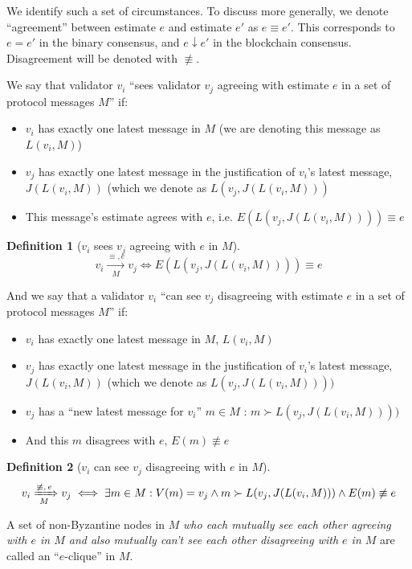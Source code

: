 \documentclass{article}
\theoremstyle{definition}
\newtheorem{defn}{Definition}[section]
\begin{document}
We identify such a set of circumstances. To discuss more generally, we denote ``agreement'' between estimate $e$ and estimate $e'$ as $e \equiv e'$. This corresponds to $e = e'$ in the binary consensus, and $e \downarrow e'$ in the blockchain consensus. Disagreement will be denoted with $\not\equiv$.

We say that validator $v_i$ ``sees validator $v_j$ agreeing with estimate $e$ in a set of protocol messages $M$'' if:
\begin{itemize}
\item $v_i$ has exactly one latest message in $M$ (we are denoting this message as $L(v_i, M)$)
\item $v_j$ has exactly one latest message in the justification of $v_i$'s latest message, $J(L(v_i, M))$ (which we denote as $L(v_j, J(L(v_i, M)))$
\item This message's estimate agrees with $e$, i.e. $E(L(v_j, J(L(v_i, M)))) \equiv e$
\end{itemize}

\begin{defn}[$v_i$ sees $v_j$ agreeing with $e$ in $M$]
$$
v_i \xrightarrow[\text{$M$}]{\text{$\equiv, e$}} v_j \iff E(L(v_j, J(L(v_i, M)))) \equiv e
$$
\end{defn}

And we say that a validator $v_i$ ``can see $v_j$ disagreeing with estimate $e$ in a set of protocol messages $M$'' if:
\begin{itemize}
\item $v_i$ has exactly one latest message in $M$, $L(v_i, M)$
\item $v_j$ has exactly one latest message in the justification of $v_i$'s latest message, $J(L(v_i, M))$ (which we denote as $L(v_j, J(L(v_i, M))))$
\item $v_j$ has a ``new latest message for $v_i$'' $m \in M$ : $m \succ L(v_j, J(L(v_i, M))))$
\item And this $m$ disagrees with $e$, $E(m) \not\equiv e$
\end{itemize}

\begin{defn}[$v_i$ can see $v_j$ disagreeing with $e$ in $M$]
$$
v_i \xRightarrow[\text{$M$}]{\text{$\not\equiv, e$}} v_j \iff \exists m \in M : V(m) = v_j \land m \succ L(v_j, J(L(v_i, M))) \land E(m) \not\equiv e
$$
\end{defn}

A set of non-Byzantine nodes in $M$ \emph{who each mutually see each other agreeing with $e$ in $M$ and also mutually can't see each other disagreeing with $e$ in $M$} are called an ``$e$-clique'' in $M$.
\end{document}

